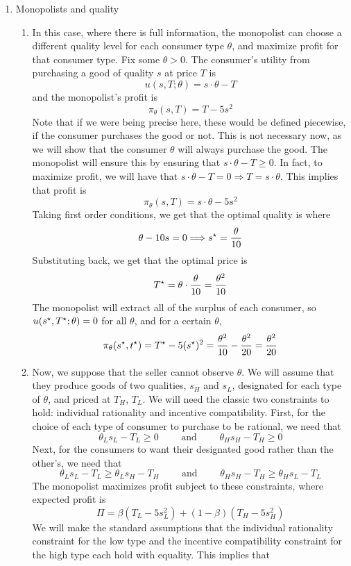 \documentclass[12pt]{article}
\begin{document}
\begin{enumerate}
	\item Monopolists and quality
	\begin{enumerate}
		\item In this case, where there is full information, the monopolist can choose a different quality level for each consumer type $\theta$, and maximize profit for that consumer type. Fix some $\theta > 0$. The consumer's utility from purchasing a good of quality $s$ at price $T$ is
		\[
		u(s,T ; \theta) = s \cdot \theta - T
		\]
		and the monopolist's profit is
		\[
		\pi_\theta(s,T) = T - 5s^2
		\]
		Note that if we were being precise here, these would be defined piecewise, if the consumer purchases the good or not. This is not necessary now, as we will show that the consumer $\theta$ will always purchase the good. The monopolist will ensure this by ensuring that $s \cdot \theta - T \ge 0$. In fact, to maximize profit, we will have that $s \cdot \theta - T = 0 \Longrightarrow T = s \cdot \theta$. This implies that profit is
		\[
		\pi_\theta(s,T) = s\cdot\theta - 5s^2
		\]
		Taking first order conditions, we get that the optimal quality is where
		\[
		\theta - 10s = 0 \Longrightarrow s^\star = \frac{\theta}{10}
		\]
		Substituting back, we get that the optimal price is
		\[
		T^\star = \theta \cdot  \frac{\theta}{10} = \frac{\theta^2}{10}
		\]
		The monopolist will extract all of the surplus of each consumer, so $u(s^\star,T^\star;\theta) = 0$ for all $\theta$, and for a certain $\theta$, 
		\[
		\pi_\theta(s^\star,t^\star) = T^\star - 5(s^\star)^2 = \frac{\theta^2}{10} - \frac{\theta^2}{20} = \frac{\theta^2}{20}
		\]
		\item Now, we suppose that the seller cannot observe $\theta$. We will assume that they produce goods of two qualities, $s_H$ and $s_L$, designated for each type of $\theta$, and priced at $T_H$, $T_L$. We will need the classic two constraints to hold: individual rationality and incentive compatibility. First, for the choice of each type of consumer to purchase to be rational, we need that
		\[
		\theta_Ls_L - T_L \ge 0 \qquad \text{ and } \qquad \theta_H s_H - T_H \ge 0
		\]
		Next, for the consumers to want their designated good rather than the other's, we need that
		\[
		\theta_Ls_L - T_L \ge \theta_L s_H - T_H \qquad \text{ and } \qquad \theta_Hs_H - T_H \ge \theta_H s_L - T_L
		\]
		The monopolist maximizes profit subject to these constraints, where expected profit is
		\[
		\Pi = \beta (T_L - 5s_L^2) + (1-\beta)(T_H - 5s_H^2)
		\]
		We will make the standard assumptions that the individual rationality constraint for the low type and the incentive compatibility constraint for the high type each hold with equality. This implies that

\end{enumerate}
\end{enumerate}
\end{document}
